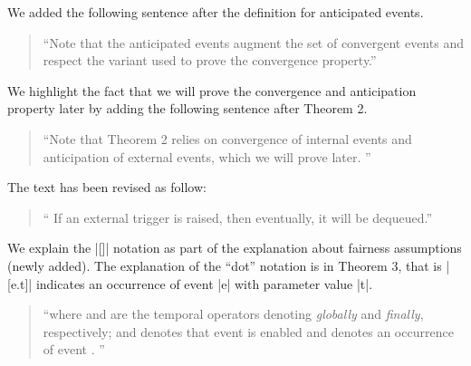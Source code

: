 \documentclass{response}
\begin{document}
\begin{response}
  We added the following sentence after the definition for anticipated events.
  \begin{quote}
    ``Note that the anticipated events augment the set of convergent
    events and respect the variant used to prove the
    convergence property.''
  \end{quote}
\end{response}

\begin{comment}{Reviewer \#1}
• p.22 Proof of Convergence an Anticipation I wonder if this paragraph should 
not be before because you use such arguments before just after stating Theorem 
2.
\end{comment}

\begin{response}
  We highlight the fact that we will prove the convergence and
  anticipation property later by adding the following sentence after
  Theorem 2.
  \begin{quote}
    ``Note that Theorem 2 relies on convergence
  of internal events and anticipation of external events, which we
  will prove later.   ''
  \end{quote}
\end{response}

\begin{comment}{Reviewer \#1}
• p.23 typo. it will be dequeued.
\end{comment}

\begin{response}
  The text has been revised as follow:
  \begin{quote}
    `` If an external trigger is raised, then eventually, it will be dequeued.''
  \end{quote}
\end{response}

\begin{comment}{Reviewer \#1}
• p. 23 could you explain the square bracket notation, e.g. [externalTrigger.t]
\end{comment}

\begin{response}
  We explain the |[]| notation as part of the explanation about
  fairness assumptions (newly added). The explanation of the ``dot''
  notation is in Theorem 3, that is |[e.t]| indicates an occurrence of
  event |e| with parameter value |t|.
  \begin{quote}
    ``where \mbox{} and \mbox{} are the
  temporal operators denoting \emph{globally} and \emph{finally},
  respectively; and \mbox{} denotes that
  event \mbox{} is enabled and
  \mbox{\EventBInline{[e]}} denotes an occurrence of event
  \mbox{}.
   ''
  \end{quote}
\end{response}
\end{document}

